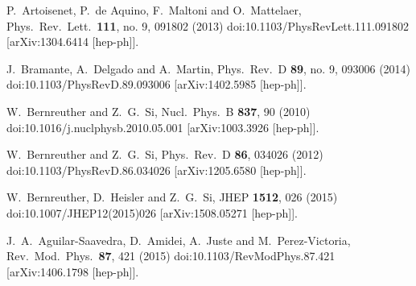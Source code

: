 \documentclass[twocolumn,prd,noshowpacs,nofootinbib,amsmath,amssymb,superscriptaddress,preprintnumbers]{revtex4}
\begin{document}
\begin{thebibliography}{99}
  P.~Artoisenet, P.~de Aquino, F.~Maltoni and O.~Mattelaer,
  Phys.\ Rev.\ Lett.\  {\bf 111}, no. 9, 091802 (2013)
  doi:10.1103/PhysRevLett.111.091802
  [arXiv:1304.6414 [hep-ph]].


  J.~Bramante, A.~Delgado and A.~Martin,
  Phys.\ Rev.\ D {\bf 89}, no. 9, 093006 (2014)
  doi:10.1103/PhysRevD.89.093006
  [arXiv:1402.5985 [hep-ph]].



  W.~Bernreuther and Z.~G.~Si,
  Nucl.\ Phys.\ B {\bf 837}, 90 (2010)
  doi:10.1016/j.nuclphysb.2010.05.001
  [arXiv:1003.3926 [hep-ph]].


  W.~Bernreuther and Z.~G.~Si,
  Phys.\ Rev.\ D {\bf 86}, 034026 (2012)
  doi:10.1103/PhysRevD.86.034026
  [arXiv:1205.6580 [hep-ph]].



  W.~Bernreuther, D.~Heisler and Z.~G.~Si,
  JHEP {\bf 1512}, 026 (2015)
  doi:10.1007/JHEP12(2015)026
  [arXiv:1508.05271 [hep-ph]].


  J.~A.~Aguilar-Saavedra, D.~Amidei, A.~Juste and M.~Perez-Victoria,
  Rev.\ Mod.\ Phys.\  {\bf 87}, 421 (2015)
  doi:10.1103/RevModPhys.87.421
  [arXiv:1406.1798 [hep-ph]].




\end{thebibliography}
\end{document}
